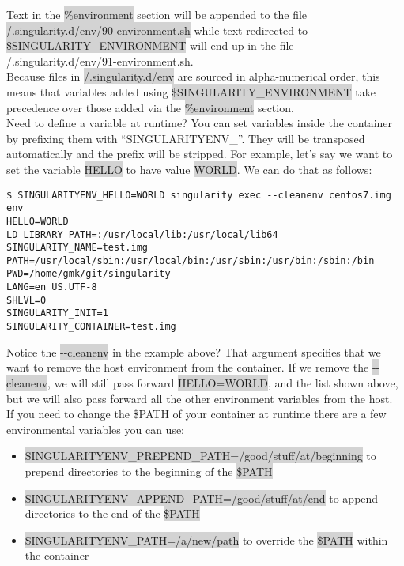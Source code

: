 \documentclass[a4paper]{article}
\begin{document}
Text in the \colorbox{lightgray}{\%environment} section will be appended to the file\colorbox{lightgray}{ /.singularity.d/env/90-environment.sh} while text redirected to \colorbox{lightgray}{\$SINGULARITY\_ENVIRONMENT} will end up in the file /.singularity.d/env/91-environment.sh.\\[0.1in]

Because files in \colorbox{lightgray}{/.singularity.d/env} are sourced in alpha-numerical order, this means that variables added using \colorbox{lightgray}{\$SINGULARITY\_ENVIRONMENT} take precedence over those added via the \colorbox{lightgray}{\%environment} section.\\[0.1in]

Need to define a variable at runtime? You can set variables inside the container by prefixing them with “SINGULARITYENV\_”. They will be transposed automatically and the prefix will be stripped. For example, let’s say we want to set the variable \colorbox{lightgray}{HELLO} to have value \colorbox{lightgray}{WORLD}. We can do that as follows:

\begin{lstlisting}[frame=single] 
$ SINGULARITYENV_HELLO=WORLD singularity exec --cleanenv centos7.img env
HELLO=WORLD
LD_LIBRARY_PATH=:/usr/local/lib:/usr/local/lib64
SINGULARITY_NAME=test.img
PATH=/usr/local/sbin:/usr/local/bin:/usr/sbin:/usr/bin:/sbin:/bin
PWD=/home/gmk/git/singularity
LANG=en_US.UTF-8
SHLVL=0
SINGULARITY_INIT=1
SINGULARITY_CONTAINER=test.img 
\end{lstlisting}

Notice the \colorbox{lightgray}{-{}-cleanenv} in the example above? That argument specifies that we want to remove the host environment from the container. If we remove the \colorbox{lightgray}{-{}-cleanenv}, we will still pass forward \colorbox{lightgray}{HELLO=WORLD}, and the list shown above, but we will also pass forward all the other environment variables from the host.
\\[0.1in]

If you need to change the \$PATH of your container at runtime there are a few environmental variables you can use:
\\[0.1in]

\begin{itemize}
\item \colorbox{lightgray}{SINGULARITYENV\_PREPEND\_PATH=/good/stuff/at/beginning} to prepend directories to the beginning of the \colorbox{lightgray}{\$PATH}
\item \colorbox{lightgray}{SINGULARITYENV\_APPEND\_PATH=/good/stuff/at/end} to append directories to the end of the \colorbox{lightgray}{\$PATH}
\item \colorbox{lightgray}{SINGULARITYENV\_PATH=/a/new/path} to override the \colorbox{lightgray}{\$PATH} within the container
\end{itemize}
\end{document}
